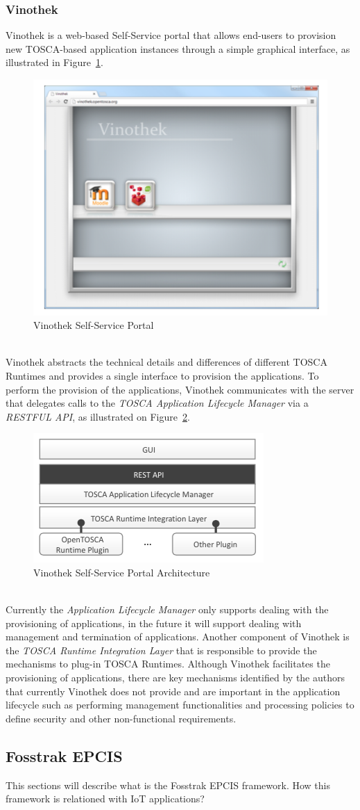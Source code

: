 \subsubsection{Vinothek}
\label{subs:Vinothek}
Vinothek \cite{breitenbucher2014vinothek} is a web-based Self-Service portal that allows end-users to provision new TOSCA-based application instances through a simple graphical interface, as illustrated in Figure~\ref{fig:vinothek}.
\begin{figure}[h!]
  \centering
  \includegraphics[width=.5\textwidth]{images/vinothek}
  \caption{Vinothek Self-Service Portal}
  \label{fig:vinothek}
\end{figure}\\
Vinothek abstracts the technical details and differences of different TOSCA Runtimes and provides a single interface to provision the applications. To perform the provision of the applications, Vinothek communicates with the server that
delegates calls to the \textit{TOSCA Application Lifecycle Manager} via a \textit{RESTFUL API}, as illustrated on Figure~\ref{fig:vinothek_architecture}.
\begin{figure}[h!]
  \centering
  \includegraphics[width=.5\textwidth]{images/vinothek_architecture}
  \caption{Vinothek Self-Service Portal Architecture}
  \label{fig:vinothek_architecture}
\end{figure}\\
Currently the \textit{Application Lifecycle Manager} only supports dealing with the provisioning of applications, in the future it will support dealing with management and termination of applications. Another component of Vinothek is the
\textit{TOSCA Runtime Integration Layer} that is responsible to provide the mechanisms to plug-in TOSCA Runtimes. Although Vinothek facilitates the provisioning of applications, there are key mechanisms identified by the authors that currently Vinothek
does not provide and are important in the application lifecycle such as performing management functionalities and processing policies to define security and other non-functional requirements.
\subsection{Fosstrak EPCIS}
\label{sub:Fosstrak EPCIS}
This sections will describe what is the Fosstrak EPCIS framework. How this framework is relationed with IoT applications?
